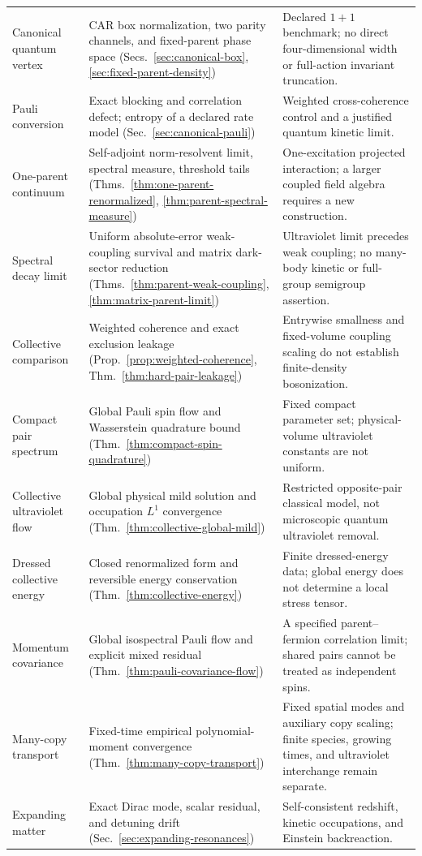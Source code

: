 \documentclass[11pt,a4paper,oneside]{book}
\theoremstyle{plain}
\theoremstyle{definition}
\theoremstyle{remark}
\begin{document}
\begin{longtable}{@{}>{\raggedright\arraybackslash}p{}>{\raggedright\arraybackslash}p{}>{\raggedright\arraybackslash}p{}@{}}
Canonical quantum vertex & CAR box normalization, two parity channels, and fixed-parent phase space (Secs.~\ref{sec:canonical-box}, \ref{sec:fixed-parent-density}) & Declared $1+1$ benchmark; no direct four-dimensional width or full-action invariant truncation.\\[1pt]
Pauli conversion & Exact blocking and correlation defect; entropy of a declared rate model (Sec.~\ref{sec:canonical-pauli}) & Weighted cross-coherence control and a justified quantum kinetic limit.\\[1pt]
One-parent continuum & Self-adjoint norm-resolvent limit, spectral measure, threshold tails (Thms.~\ref{thm:one-parent-renormalized}, \ref{thm:parent-spectral-measure}) & One-excitation projected interaction; a larger coupled field algebra requires a new construction.\\[1pt]
Spectral decay limit & Uniform absolute-error weak-coupling survival and matrix dark-sector reduction (Thms.~\ref{thm:parent-weak-coupling}, \ref{thm:matrix-parent-limit}) & Ultraviolet limit precedes weak coupling; no many-body kinetic or full-group semigroup assertion.\\[1pt]
Collective comparison & Weighted coherence and exact exclusion leakage (Prop.~\ref{prop:weighted-coherence}, Thm.~\ref{thm:hard-pair-leakage}) & Entrywise smallness and fixed-volume coupling scaling do not establish finite-density bosonization.\\[1pt]
Compact pair spectrum & Global Pauli spin flow and Wasserstein quadrature bound (Thm.~\ref{thm:compact-spin-quadrature}) & Fixed compact parameter set; physical-volume ultraviolet constants are not uniform.\\[1pt]
Collective ultraviolet flow & Global physical mild solution and occupation $L^1$ convergence (Thm.~\ref{thm:collective-global-mild}) & Restricted opposite-pair classical model, not microscopic quantum ultraviolet removal.\\[1pt]
Dressed collective energy & Closed renormalized form and reversible energy conservation (Thm.~\ref{thm:collective-energy}) & Finite dressed-energy data; global energy does not determine a local stress tensor.\\[1pt]
Momentum covariance & Global isospectral Pauli flow and explicit mixed residual (Thm.~\ref{thm:pauli-covariance-flow}) & A specified parent--fermion correlation limit; shared pairs cannot be treated as independent spins.\\[1pt]
Many-copy transport & Fixed-time empirical polynomial-moment convergence (Thm.~\ref{thm:many-copy-transport}) & Fixed spatial modes and auxiliary copy scaling; finite species, growing times, and ultraviolet interchange remain separate.\\[1pt]
Expanding matter & Exact Dirac mode, scalar residual, and detuning drift (Sec.~\ref{sec:expanding-resonances}) & Self-consistent redshift, kinetic occupations, and Einstein backreaction.\\[1pt]
\end{longtable}
\normalsize
\end{document}
